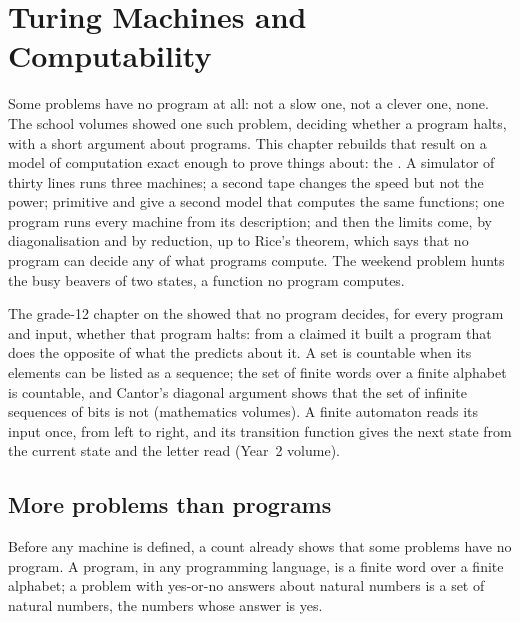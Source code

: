 \chapter{Turing Machines and Computability}\label{ch:b3:computability}

Some problems have no program at all: not a slow one, not a clever one, none. The school volumes showed one such problem, deciding whether a program halts, with a short argument about programs. This chapter rebuilds that result on a model of computation exact enough to prove things about: the . A simulator of thirty lines runs three machines; a second tape changes the speed but not the power; primitive and  give a second model that computes the same functions; one program runs every machine from its description; and then the limits come, by diagonalisation and by reduction, up to Rice's theorem, which says that no program can decide any  of what programs compute. The weekend problem hunts the busy beavers of two states, a function no program computes.

\begin{recall}
The grade-12 chapter on the  showed that no program decides, for every program and input, whether that program halts: from a claimed  it built a program that does the opposite of what the  predicts about it. A set is countable when its elements can be listed as a sequence; the set of finite words over a finite alphabet is countable, and Cantor's diagonal argument shows that the set of infinite sequences of bits is not (mathematics volumes). A finite automaton reads its input once, from left to right, and its transition function gives the next state from the current state and the letter read (Year~2 volume).
\end{recall}

\section{More problems than programs}\label{sec:b3:computability:counting}

Before any machine is defined, a count already shows that some problems have no program. A program, in any programming language, is a finite word over a finite alphabet; a problem with yes-or-no answers about natural numbers is a set of natural numbers, the numbers whose answer is yes.


